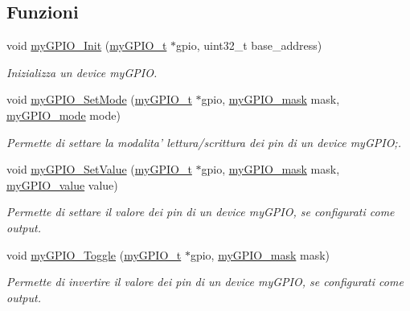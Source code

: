 \subsection*{Funzioni}
\begin{DoxyCompactItemize}
\item 
void \hyperlink{group__bare-metal_ga588201358d1633c53535b288c9198531}{my\+G\+P\+I\+O\+\_\+\+Init} (\hyperlink{structmy_g_p_i_o__t}{my\+G\+P\+I\+O\+\_\+t} $\ast$gpio, uint32\+\_\+t base\+\_\+address)
\begin{DoxyCompactList}\small\item\em Inizializza un device my\+G\+P\+I\+O. \end{DoxyCompactList}\item 
void \hyperlink{group__bare-metal_ga43e82eb0febd452635a438fbd9cb853b}{my\+G\+P\+I\+O\+\_\+\+Set\+Mode} (\hyperlink{structmy_g_p_i_o__t}{my\+G\+P\+I\+O\+\_\+t} $\ast$gpio, \hyperlink{group__bare-metal_ga402a0d20afc0cb7c25554b8b023f4253}{my\+G\+P\+I\+O\+\_\+mask} mask, \hyperlink{group__bare-metal_ga76b849f0e0c05e7f9161bdb33396f2b1}{my\+G\+P\+I\+O\+\_\+mode} mode)
\begin{DoxyCompactList}\small\item\em Permette di settare la modalita' lettura/scrittura dei pin di un device my\+G\+P\+I\+O;. \end{DoxyCompactList}\item 
void \hyperlink{group__bare-metal_ga9d9ce9d2db7d77a588da4a3749f2f24d}{my\+G\+P\+I\+O\+\_\+\+Set\+Value} (\hyperlink{structmy_g_p_i_o__t}{my\+G\+P\+I\+O\+\_\+t} $\ast$gpio, \hyperlink{group__bare-metal_ga402a0d20afc0cb7c25554b8b023f4253}{my\+G\+P\+I\+O\+\_\+mask} mask, \hyperlink{group__bare-metal_gaf634fe4a0e1eab8da5000b72d6ad362b}{my\+G\+P\+I\+O\+\_\+value} value)
\begin{DoxyCompactList}\small\item\em Permette di settare il valore dei pin di un device my\+G\+P\+I\+O, se configurati come output. \end{DoxyCompactList}\item 
void \hyperlink{group__bare-metal_ga449b2af7cc20d24e6f6e017cf792ce03}{my\+G\+P\+I\+O\+\_\+\+Toggle} (\hyperlink{structmy_g_p_i_o__t}{my\+G\+P\+I\+O\+\_\+t} $\ast$gpio, \hyperlink{group__bare-metal_ga402a0d20afc0cb7c25554b8b023f4253}{my\+G\+P\+I\+O\+\_\+mask} mask)
\begin{DoxyCompactList}\small\item\em Permette di invertire il valore dei pin di un device my\+G\+P\+I\+O, se configurati come output. \end{DoxyCompactList}\item 

\end{DoxyCompactItemize}
